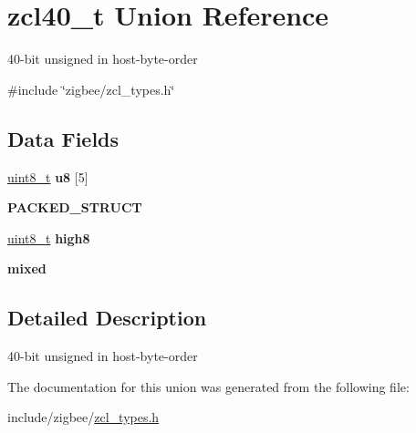 \hypertarget{unionzcl40__t}{\section{zcl40\-\_\-t Union Reference}
\label{unionzcl40__t}
}


40-\/bit unsigned in host-\/byte-\/order  




{\ttfamily \#include \char`\"{}zigbee/zcl\-\_\-types.\-h\char`\"{}}

\subsection*{Data Fields}
\begin{DoxyCompactItemize}
\item 
\hypertarget{group__zcl__types_gad4679e287f6f18ba62228daa926eea7b}{\hyperlink{group__hal_gae1affc9ca37cfb624959c866a73f83c2}{uint8\-\_\-t} {\bfseries u8} \mbox{[}5\mbox{]}}\label{group__zcl__types_gad4679e287f6f18ba62228daa926eea7b}

\item 
{\bfseries P\-A\-C\-K\-E\-D\-\_\-\-S\-T\-R\-U\-C\-T}
\item 
\hypertarget{group__zcl__types_gac0be63c87188a7765bd25f38f3bf5b9e}{\hyperlink{group__hal_gae1affc9ca37cfb624959c866a73f83c2}{uint8\-\_\-t} {\bfseries high8}}\label{group__zcl__types_gac0be63c87188a7765bd25f38f3bf5b9e}

\item 
\hypertarget{group__zcl__types_ga1c5d0403e0a7a57d3778e56e8798faa8}{{\bfseries mixed}}\label{group__zcl__types_ga1c5d0403e0a7a57d3778e56e8798faa8}

\end{DoxyCompactItemize}


\subsection{Detailed Description}
40-\/bit unsigned in host-\/byte-\/order 

The documentation for this union was generated from the following file\-:\begin{DoxyCompactItemize}
\item 
include/zigbee/\hyperlink{zcl__types_8h}{zcl\-\_\-types.\-h}\end{DoxyCompactItemize}
